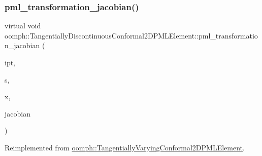 \subsubsection{\texorpdfstring{pml\+\_\+transformation\+\_\+jacobian()}{pml\_transformation\_jacobian()}\hspace{0.1cm}{\footnotesize\ttfamily [1/2]}}
{\footnotesize\ttfamily virtual void oomph\+::\+Tangentially\+Discontinuous\+Conformal2\+D\+P\+M\+L\+Element\+::pml\+\_\+transformation\+\_\+jacobian (\begin{DoxyParamCaption}\item[{const unsigned \&}]{ipt,  }\item[{const \hyperlink{classoomph_1_1Vector}{Vector}$<$ double $>$ \&}]{s,  }\item[{const \hyperlink{classoomph_1_1Vector}{Vector}$<$ double $>$ \&}]{x,  }\item[{\hyperlink{classoomph_1_1DenseComplexMatrix}{Dense\+Complex\+Matrix} \&}]{jacobian }\end{DoxyParamCaption})\hspace{0.3cm}{\ttfamily [virtual]}}



Reimplemented from \hyperlink{classoomph_1_1TangentiallyVaryingConformal2DPMLElement_adcd024767abae57059b87fa19b1d489c}{oomph\+::\+Tangentially\+Varying\+Conformal2\+D\+P\+M\+L\+Element}.

\mbox{\label{classoomph_1_1TangentiallyDiscontinuousConformal2DPMLElement_a2436ebd949ec246a11a7b617a890443e}} 

